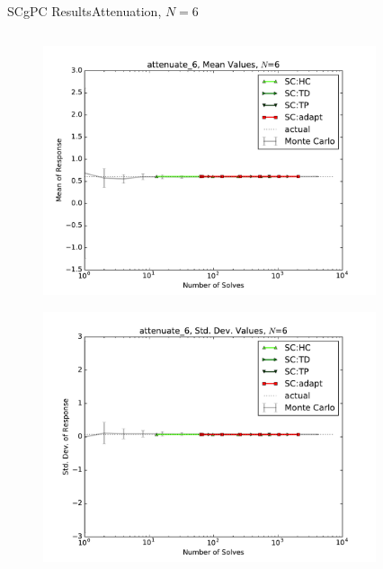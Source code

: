 \documentclass{beamer}
\begin{document}
\begin{frame}{SCgPC Results}{Attenuation, $N=6$}\vspace{-20pt}
 \begin{columns}
   \begin{column}{0.5\textwidth}
        \begin{figure}[h!]
          \centering
          \includegraphics[width=0.8\linewidth]{anlmodels/attenuate_6_mean_vals_nohdmr}
        \end{figure}
        \vspace{-20pt}
        \begin{figure}[h!]
          \centering
          \includegraphics[width=0.8\linewidth]{anlmodels/attenuate_6_var_vals_nohdmr}
        \end{figure}
   \end{column}
   \begin{column}{0.5\textwidth}
        \begin{figure}[h!]
          \centering

\end{figure}
\end{column}
\end{columns}
\end{frame}
\end{document}
